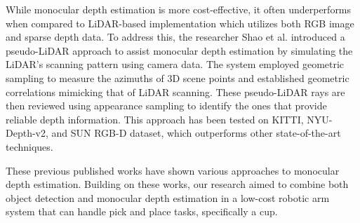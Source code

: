 \vspace{10pt}

While monocular depth estimation is more cost-effective, it often underperforms when compared to LiDAR-based implementation which utilizes both RGB image and sparse depth data. To address this, the researcher Shao et al. \cite{shuwei_shao_2024} introduced a pseudo-LiDAR approach to assist monocular depth estimation by simulating the LiDAR’s scanning pattern using camera data. The system employed geometric sampling to measure the azimuths of 3D scene points and established geometric correlations mimicking that of LiDAR scanning. These pseudo-LiDAR rays are then reviewed using appearance sampling to identify the ones that provide reliable depth information. This approach has been tested on KITTI, NYU-Depth-v2, and SUN RGB-D dataset, which outperforms other state-of-the-art techniques.

\vspace{10pt}

These previous published works have shown various approaches to monocular depth estimation. Building on these works, our research aimed to combine both object detection and monocular depth estimation in a low-cost robotic arm system that can handle pick and place tasks, specifically a cup.
